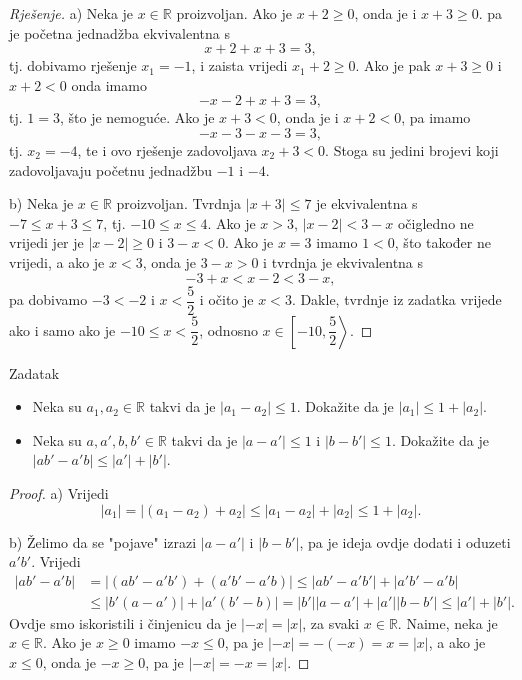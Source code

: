 \begin{proof}[Rješenje]
a) Neka je $x\in \mathbb{R}$ proizvoljan. Ako je $x+2\geq 0$, onda je i $x+3\geq 0$. pa je početna jednadžba ekvivalentna s $$x+2+x+3=3,$$ tj. dobivamo rješenje $x_1=-1$, i zaista vrijedi $x_1+2\geq 0$. Ako je pak $x+3\geq 0$ i $x+2<0$ onda imamo $$-x-2+x+3=3,$$ tj. $1=3$, što je nemoguće. Ako je $x+3< 0$, onda je i $x+2< 0$, pa imamo $$-x-3-x-3=3,$$ tj. $x_2=-4$, te i ovo rješenje zadovoljava $x_2+3<0$. Stoga su jedini brojevi koji zadovoljavaju početnu jednadžbu $-1$ i $-4$.

b) Neka je $x\in \mathbb{R}$ proizvoljan. Tvrdnja $\lvert x+3\rvert\leq 7$ je ekvivalentna s $-7\leq x+3\leq 7$, tj. $-10\leq x\leq 4$. Ako je $x> 3$, $\lvert x-2\rvert< 3-x$ očigledno ne vrijedi jer je $\lvert x-2\rvert\geq 0$ i $3-x<0$. Ako je $x=3$ imamo $1<0$, što također ne vrijedi, a ako je $x<3$, onda je $3-x>0$ i tvrdnja je ekvivalentna s $$-3+x<x-2<3-x,$$ pa dobivamo $-3<-2$ i $x< \dfrac{5}{2}$ i očito je $x<3$. Dakle, tvrdnje iz zadatka vrijede ako i samo ako je $-10\leq x<\dfrac{5}{2}$, odnosno $x\in \left[ -10, \dfrac{5}{2}\right\rangle$.
\end{proof}
\begin{exercise}{Zadatak} \textbf{}
\label{absvaluetricks}
\begin{itemize}
\item[a)] Neka su $a_1, a_2\in \mathbb{R}$ takvi da je $\left\lvert a_1-a_2\right\rvert\leq 1$. Dokažite da je $\left\lvert a_1\right\rvert\leq 1+\left\lvert a_2\right\rvert$.
\item[b)] Neka su $a, a', b, b'\in \mathbb{R}$ takvi da je $\lvert a-a'\rvert\leq 1$ i $\lvert b-b'\rvert\leq 1$. Dokažite da je $\lvert ab'- a'b\rvert\leq \lvert a'\rvert+\lvert b'\rvert$.
\end{itemize}
\end{exercise}
\begin{proof}
a) Vrijedi
$$\left\lvert a_1\right\rvert=\left\lvert \left(a_1-a_2\right)+a_2\right\rvert\leq \left\lvert a_1-a_2\right\rvert + \left\lvert a_2\right\rvert\leq 1+ \left\lvert a_2\right\rvert.$$

b) Želimo da se "pojave" izrazi $\lvert a-a'\rvert$ i $\lvert b-b'\rvert$, pa je ideja ovdje dodati i oduzeti $a'b'$. Vrijedi
\begin{align*}
\lvert ab'-a'b\rvert&=\lvert \left(ab'-a'b'\right)+\left(a'b'-a'b\right)\rvert\leq \lvert ab'-a'b'\rvert+\lvert a'b'-a'b\rvert\\
&\leq \lvert b'\left(a-a'\right)\rvert+\lvert a'\left(b'-b\right)\rvert=\lvert b'\rvert\lvert a-a'\rvert+\lvert a'\rvert\lvert b-b'\rvert\leq \lvert a'\rvert+\lvert b'\rvert.
\end{align*}
Ovdje smo iskoristili i činjenicu da je $\lvert -x\rvert=\lvert x\rvert$, za svaki $x\in \mathbb{R}$. Naime, neka je $x\in \mathbb{R}$. Ako je $x\geq 0$ imamo $-x\leq 0$, pa je $\lvert -x\rvert=-(-x)=x=\lvert x\rvert$, a ako je $x\leq 0$, onda je $-x\geq 0$, pa je $\lvert -x\rvert=-x=\lvert x\rvert$.
\end{proof}
